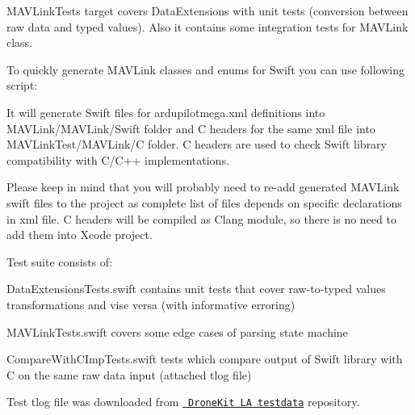 {\ttfamily M\+A\+V\+Link\+Tests} target covers {\ttfamily Data\+Extensions} with unit tests (conversion between raw data and typed values). Also it contains some integration tests for {\ttfamily M\+A\+V\+Link} class.

To quickly generate M\+A\+V\+Link classes and enums for Swift you can use following script\+:


\begin{DoxyCode}{0}
\end{DoxyCode}
 It will generate Swift files for {\ttfamily ardupilotmega.\+xml} definitions into {\ttfamily M\+A\+V\+Link/\+M\+A\+V\+Link/\+Swift} folder and C headers for the same xml file into {\ttfamily M\+A\+V\+Link\+Test/\+M\+A\+V\+Link/C} folder. C headers are used to check Swift library compatibility with C/\+C++ implementations.

Please keep in mind that you will probably need to re-\/add generated M\+A\+V\+Link swift files to the project as complete list of files depends on specific declarations in xml file. C headers will be compiled as Clang module, so there is no need to add them into Xcode project.

Test suite consists of\+:
\begin{DoxyItemize}
\item {\ttfamily Data\+Extensions\+Tests.\+swift} contains unit tests that cover raw-\/to-\/typed values transformations and vise versa (with informative erroring)
\item {\ttfamily M\+A\+V\+Link\+Tests.\+swift} covers some edge cases of parsing state machine
\item {\ttfamily Compare\+With\+C\+Imp\+Tests.\+swift} tests which compare output of Swift library with C on the same raw data input (attached tlog file)
\end{DoxyItemize}

Test tlog file was downloaded from \href{https://github.com/dronekit/dronekit-la-testdata}{\texttt{ Drone\+Kit LA testdata}} repository. 